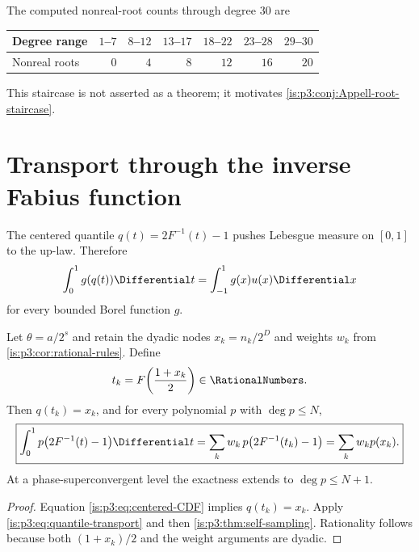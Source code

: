 The computed nonreal-root counts through degree $30$ are
\begin{center}
\begin{tabular}{@{}lrrrrrr@{}}
\toprule
Degree range & $1$--$7$ & $8$--$12$ & $13$--$17$ & $18$--$22$ & $23$--$28$ & $29$--$30$\\
\midrule
Nonreal roots & $0$ & $4$ & $8$ & $12$ & $16$ & $20$\\
\bottomrule
\end{tabular}
\end{center}
This staircase is not asserted as a theorem; it motivates \cref{is:p3:conj:Appell-root-staircase}.

\section{Transport through the inverse Fabius function}
\label{is:p3:sec:inverse-transport}

The centered quantile $q(t)=2F^{-1}(t)-1$ pushes Lebesgue measure on $[0,1]$ to the up-law.  Therefore
\begin{equation}
 \int_0^1g(q(t))\Differential t=\int_{-1}^{1}g(x)u(x)\Differential x
 \label{is:p3:eq:quantile-transport}
\end{equation}
for every bounded Borel function $g$.

\begin{theorem}
\label{is:p3:thm:inverse-Fabius-quadrature}
Let $\theta=a/2^s$ and retain the dyadic nodes $x_k=n_k/2^D$ and weights $w_k$ from \cref{is:p3:cor:rational-rules}.  Define
\begin{equation}
 t_k=F\!\left(\frac{1+x_k}{2}\right)\in\RationalNumbers.
 \label{is:p3:eq:inverse-Fabius-nodes}
\end{equation}
Then $q(t_k)=x_k$, and for every polynomial $p$ with $\deg p\le N$,
\begin{equation}
 \boxed{\displaystyle
 \int_0^1p\bigl(2F^{-1}(t)-1\bigr)\Differential t
 =\sum_k w_k\,p\bigl(2F^{-1}(t_k)-1\bigr)
 =\sum_k w_kp(x_k).}
 \label{is:p3:eq:inverse-Fabius-quadrature}
\end{equation}
At a phase-superconvergent level the exactness extends to $\deg p\le N+1$.
\end{theorem}

\begin{proof}
Equation \eqref{is:p3:eq:centered-CDF} implies $q(t_k)=x_k$.  Apply \eqref{is:p3:eq:quantile-transport} and then \cref{is:p3:thm:self-sampling}.  Rationality follows because both $(1+x_k)/2$ and the weight arguments are dyadic.
\end{proof}

